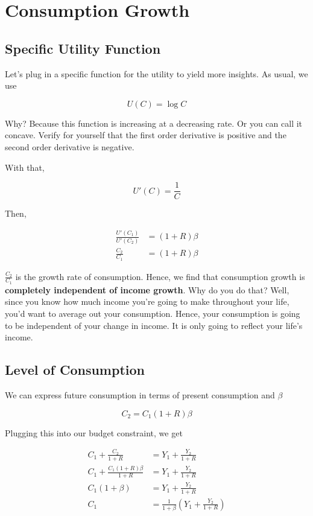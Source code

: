 \documentclass[11pt]{scrartcl}
\begin{document}
\section{Consumption Growth}

\subsection{Specific Utility Function}

Let's plug in a specific function for the utility to yield more insights. As usual, we use 

\[U(C) = \log{C} \]

Why? Because this function is increasing at a decreasing rate. Or you can call it concave. Verify for yourself that the first order derivative is positive and the second order derivative is negative.

With that,

\[U'(C) = \frac{1}{C} \]

Then,

\begin{align*}
\frac{U'(C_1)}{U'(C_2)} &= (1+R)\beta  \\
\frac{C_2}{C_1} &= (1+R) \beta 
\end{align*}

$\frac{C_2}{C_1}$ is the growth rate of consumption. Hence, we find that consumption growth is \textbf{completely independent of income growth}. Why do you do that? Well, since you know how much income you're going to make throughout your life, you'd want to average out your consumption. Hence, your consumption is going to be independent of your change in income. It is only going to reflect your life's income.

\subsection{Level of Consumption}

We can express future consumption in terms of present consumption and $\beta$

\[ C_2 = C_1 (1+R) \beta \]

Plugging this into our budget constraint, we get

\begin{align*}
C_1 + \frac{C_2}{1+R} &= Y_1 + \frac{Y_2}{1+R} \\
C_1 + \frac{C_1 (1+R) \beta}{1+R} &= Y_1 + \frac{Y_2}{1+R} \\
C_1 (1 + \beta) &= Y_1 + \frac{Y_2}{1+R} \\
C_1 &= \frac{1}{1+\beta} \left(Y_1 + \frac{Y_2}{1+R}\right)
\end{align*}
\end{document}
